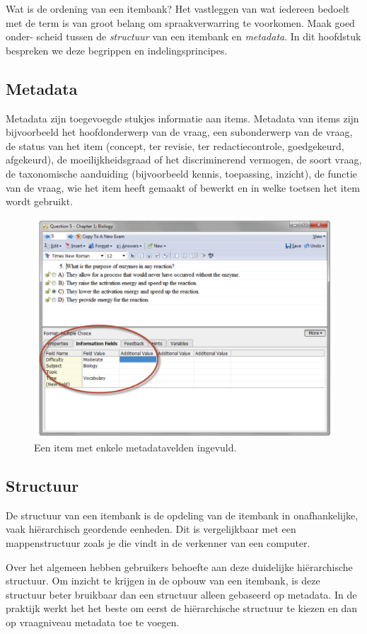 \documentclass[
]{book}
\begin{document}
Wat is de ordening van een itembank? Het vastleggen van wat iedereen bedoelt met de term is van groot belang om spraakverwarring te voorkomen. Maak goed onder- scheid tussen de \emph{structuur} van een itembank en \emph{metadata}. In dit hoofdstuk bespreken we deze begrippen en indelingsprincipes.

\hypertarget{metadata}{%
\subsection{Metadata}\label{metadata}}

Metadata zijn toegevoegde stukjes informatie aan items. Metadata van items zijn bijvoorbeeld het hoofdonderwerp van de vraag, een subonderwerp van de vraag, de status van het item (concept, ter revisie, ter redactiecontrole, goedgekeurd, afgekeurd), de moeilijkheidsgraad of het discriminerend vermogen, de soort vraag, de taxonomische aanduiding (bijvoorbeeld kennis, toepassing, inzicht), de functie van de vraag, wie het item heeft gemaakt of bewerkt en in welke toetsen het item wordt gebruikt.

\begin{figure}
\includegraphics[width=0.6\linewidth]{images/metadata} \caption{Een item met enkele metadatavelden ingevuld.}\label{fig:unnamed-chunk-1}
\end{figure}

\hypertarget{structuur}{%
\subsection{Structuur}\label{structuur}}

De structuur van een itembank is de opdeling van de itembank in onafhankelijke, vaak hiërarchisch geordende eenheden. Dit is vergelijkbaar met een mappenstructuur zoals je die vindt in de verkenner van een computer.

Over het algemeen hebben gebruikers behoefte aan deze duidelijke hiërarchische structuur. Om inzicht te krijgen in de opbouw van een itembank, is deze structuur beter bruikbaar dan een structuur alleen gebaseerd op metadata. In de praktijk werkt het het beste om eerst de hiërarchische structuur te kiezen en dan op vraagniveau metadata toe te voegen.
\end{document}
